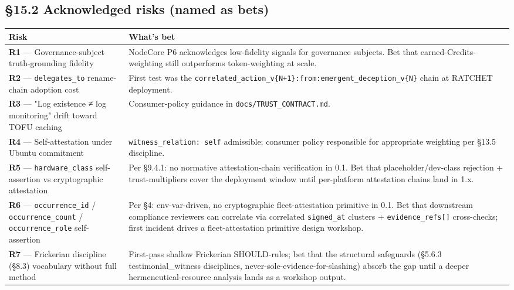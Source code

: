 \documentclass[10pt]{article}
\begin{document}
\subsection*{§15.2 Acknowledged risks (named as bets)}


{\footnotesize
\begin{longtable}{|p{8.0cm}|p{8.0cm}|}\hline
\textbf{Risk} & \textbf{What's bet} \\ \hline\endhead
\textbf{R1} — Governance-subject truth-grounding fidelity & NodeCore P6 acknowledges low-fidelity signals for governance subjects. Bet that earned-Credits-weighting still outperforms token-weighting at scale. \\ \hline
\textbf{R2} — \texttt{delegates\_to} rename-chain adoption cost & First test was the \texttt{correlated\_action\_v\{N+1\}:from:emergent\_deception\_v\{N\}} chain at RATCHET deployment. \\ \hline
\textbf{R3} — "Log existence ≠ log monitoring" drift toward TOFU caching & Consumer-policy guidance in \texttt{docs/TRUST\_CONTRACT.md}. \\ \hline
\textbf{R4} — Self-attestation under Ubuntu commitment & \texttt{witness\_relation: self} admissible; consumer policy responsible for appropriate weighting per §13.5 discipline. \\ \hline
\textbf{R5} — \texttt{hardware\_class} self-assertion vs cryptographic attestation & Per §9.4.1: no normative attestation-chain verification in 0.1. Bet that placeholder/dev-class rejection + trust-multipliers cover the deployment window until per-platform attestation chains land in 1.x. \\ \hline
\textbf{R6} — \texttt{occurrence\_id} / \texttt{occurrence\_count} / \texttt{occurrence\_role} self-assertion & Per §4: env-var-driven, no cryptographic fleet-attestation primitive in 0.1. Bet that downstream compliance reviewers can correlate via correlated \texttt{signed\_at} clusters + \texttt{evidence\_refs[]} cross-checks; first incident drives a fleet-attestation primitive design workshop. \\ \hline
\textbf{R7} — Frickerian discipline (§8.3) vocabulary without full method & First-pass shallow Frickerian SHOULD-rules; bet that the structural safeguards (§5.6.3 testimonial\_witness disciplines, never-sole-evidence-for-slashing) absorb the gap until a deeper hermeneutical-resource analysis lands as a workshop output. \\ \hline

\end{longtable}}
\end{document}
